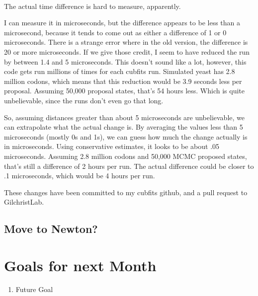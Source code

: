 ~

The actual time difference is hard to measure, apparently.

I can measure it in microseconds, but the difference appears to be less than a microsecond, because it tends to come out as either a difference of 1 or 0 microseconds. There is a strange error where in the old version, the difference is 20 or more microseconds. If we give those credit, I seem to have reduced the run by between 1.4 and 5 microseconds. This doesn't sound like a lot, however, this code gets run millions of times for each cubfits run. Simulated yeast has 2.8 million codons, which means that this reduction would be 3.9 seconds less per proposal. Assuming 50,000 proposal states, that's 54 hours less. Which is quite unbelievable, since the runs don't even go that long.

So, assuming distances greater than about 5 microseconds are unbelievable, we can extrapolate what the actual change is. By averaging the values less than 5 microseconds (mostly 0s and 1s), we can guess how much the change actually is in microseconds. Using conservative estimates, it looks to be about .05 microseconds. Assuming 2.8 million codons and 50,000 MCMC proposed states, that's still a difference of 2 hours per run. The actual difference could be closer to .1 microseconds, which would be 4 hours per run.

These changes have been committed to my cubfits github, and a pull request to GilchristLab.


\subsection{Move to Newton?}


\section{Goals for next Month}
\begin{enumerate}
\item Future Goal
\end{enumerate}



